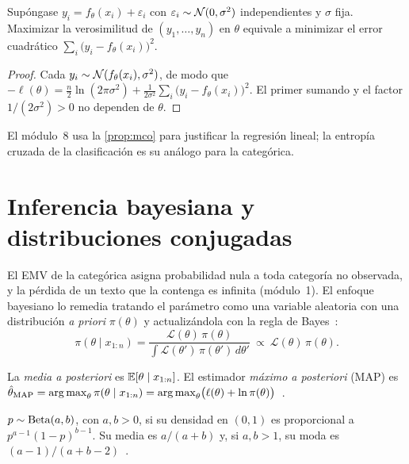 \begin{proposicion}\label{prop:mco}
Supóngase $y_i=f_\theta(x_i)+\varepsilon_i$ con $\varepsilon_i\sim\mathcal{N}(0,\sigma^{2})$ independientes y $\sigma$ fija. Maximizar la verosimilitud de $(y_1,\dots,y_n)$ en $\theta$ equivale a minimizar el error cuadrático $\sum_i\bigl(y_i-f_\theta(x_i)\bigr)^{2}$.
\end{proposicion}

\begin{proof}
Cada $y_i\sim\mathcal{N}(f_\theta(x_i),\sigma^{2})$, de modo que $-\ell(\theta)=\frac n2\ln(2\pi\sigma^{2})+\frac{1}{2\sigma^{2}}\sum_i\bigl(y_i-f_\theta(x_i)\bigr)^{2}$. El primer sumando y el factor $1/(2\sigma^{2})>0$ no dependen de $\theta$.
\end{proof}

El módulo~8 usa la \cref{prop:mco} para justificar la regresión lineal; la entropía cruzada de la clasificación es su análogo para la categórica.

\section{Inferencia bayesiana y distribuciones conjugadas}

El EMV de la categórica asigna probabilidad nula a toda categoría no observada, y la pérdida de un texto que la contenga es infinita (módulo~1). El enfoque bayesiano lo remedia tratando el parámetro como una variable aleatoria con una distribución \emph{a priori} $\pi(\theta)$ y actualizándola con la regla de Bayes~\cite[§8.1]{bt}:
\[
\pi(\theta\mid x_{1:n})=\frac{\mathcal{L}(\theta)\,\pi(\theta)}{\int\mathcal{L}(\theta')\,\pi(\theta')\,d\theta'}\ \propto\ \mathcal{L}(\theta)\,\pi(\theta).
\]

\begin{definicion}
La \emph{media a posteriori} es $\mathbb{E}[\theta\mid x_{1:n}]$. El estimador \emph{máximo a posteriori} (MAP) es $\hat\theta_{\mathrm{MAP}}=\operatorname*{arg\,max}_\theta\pi(\theta\mid x_{1:n})=\operatorname*{arg\,max}_\theta\bigl(\ell(\theta)+\ln\pi(\theta)\bigr)$~\cite[§8.2]{bt}.
\end{definicion}

\begin{definicion}
$p\sim\operatorname{Beta}(a,b)$, con $a,b>0$, si su densidad en $(0,1)$ es proporcional a $p^{a-1}(1-p)^{b-1}$. Su media es $a/(a+b)$ y, si $a,b>1$, su moda es $(a-1)/(a+b-2)$~\cite[§2.1.1]{bishop}.
\end{definicion}

